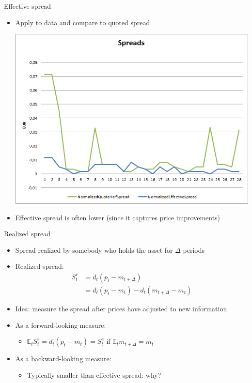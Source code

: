\documentclass[english,10pt]{beamer}
\begin{document}
\begin{frame}{Effective spread}
	\begin{itemize}
		\item Apply to data and compare to quoted spread
		\begin{center}
			\includegraphics[scale=0.39]{pics/L2_effectivespread}
		\end{center}
		\item Effective spread is often lower (since it captures price improvements)
	\end{itemize}
\end{frame}


\begin{frame}{Realized spread}
	\begin{itemize}
		\item Spread realized by somebody who holds the asset for $\Delta$ periods
		\item \alert{Realized spread}:
		\begin{align*}
		S^r_t & = d_t(p_t - m_{t+\Delta}) \\
		& = d_t(p_t-m_t) - d_t(m_{t+\Delta}-m_t)
		\end{align*}
		\item Idea: measure the spread after prices have adjusted to new information
		\item As a forward-looking measure:
		\begin{itemize}
			\item $\mathbb{E}_t S_t^r = d_t(p_t - m_t) = S_t^e$ if $\mathbb{E}_t m_{t+\Delta} = m_t$
		\end{itemize}
		\item As a backward-looking measure:
		\begin{itemize}
			\item Typically smaller than effective spread: why?
		\end{itemize}
	\end{itemize}
\end{frame}
\end{document}
